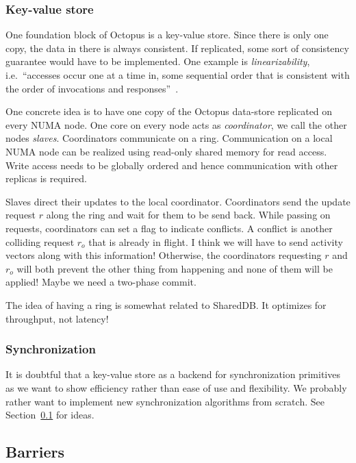 \documentclass{article}
\begin{document}
\subsubsection{Key-value store}

One foundation block of Octopus is a key-value store. Since there is
only one copy, the data in there is always consistent. If replicated,
some sort of consistency guarantee would have to be implemented. One
example is \emph{linearizability}, i.e.\ ``accesses occur one at a time
in, some sequential order that is consistent with the order of
invocations and responses''~\cite{lynch}.

One concrete idea is to have one copy of the Octopus data-store
replicated on every NUMA node. One core on every node acts as
\emph{coordinator}, we call the other nodes \emph{slaves}.
Coordinators communicate on a ring. Communication on a local NUMA node
can be realized using read-only shared memory for read access. Write
access needs to be globally ordered and hence communication with other
replicas is required. 

Slaves direct their updates to the local coordinator. Coordinators
send the update request $r$ along the ring and wait for them to be
send back. While passing on requests, coordinators can set a flag to
indicate conflicts. A conflict is another colliding request $r_o$ that
is already in flight. I think we will have to send activity vectors
along with this information! Otherwise, the coordinators requesting
$r$ and $r_o$ will both prevent the other thing from happening and
none of them will be applied! Maybe we need a two-phase commit.

The idea of having a ring is somewhat related to SharedDB. It
optimizes for throughput, not latency!

\subsubsection{Synchronization}

It is doubtful that a key-value store as a backend for synchronization
primitives as we want to show efficiency rather than ease of use and
flexibility. We probably rather want to implement new synchronization
algorithms from scratch. See Section~\ref{barriers} for ideas.

\subsection{Barriers}
\label{barriers}
\end{document}
